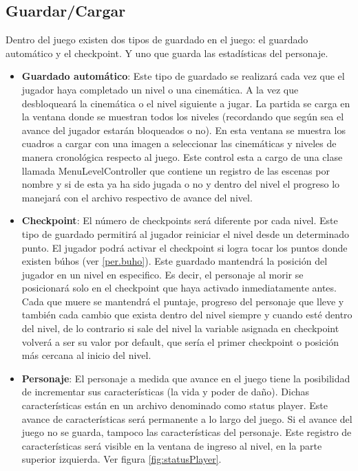 \documentclass[11pt,letterpaper]{article}
\begin{document}
	\subsection{Guardar/Cargar}
Dentro del juego existen dos tipos de guardado en el juego: el guardado automático y el checkpoint. Y uno que guarda las estadísticas del personaje.
\begin{itemize}
\item \textbf{Guardado automático}: 
Este tipo de guardado se realizará cada vez que el jugador haya completado un nivel o una cinemática.
A la vez que desbloqueará la cinemática o el nivel siguiente a jugar.
La partida se carga en la ventana donde se muestran todos los niveles (recordando que según sea el avance del jugador estarán bloqueados o no). En esta ventana se muestra los cuadros a cargar con una imagen a seleccionar las cinemáticas y niveles de manera cronológica respecto al juego.
Este control esta a cargo de una clase llamada MenuLevelController que contiene un registro de las escenas por nombre y si de esta ya ha sido jugada o no y dentro del nivel el progreso lo manejará con el archivo respectivo de avance del nivel.
\item \textbf{Checkpoint}: 
El número de checkpoints será diferente por cada nivel.
Este tipo de guardado permitirá al jugador reiniciar el nivel desde un determinado punto. El jugador podrá activar el checkpoint si logra tocar los puntos donde existen búhos (ver \ref{per.buho}). Este guardado mantendrá la posición del jugador en un nivel en especifico. Es decir, el personaje al morir se posicionará solo en el checkpoint que haya activado inmediatamente antes. 
Cada que muere se mantendrá el puntaje, progreso del personaje que lleve y también cada cambio que exista dentro del nivel siempre y cuando esté dentro del nivel, de lo contrario si sale del nivel la variable asignada en checkpoint volverá a ser su valor por default, que sería el primer checkpoint o posición más cercana al inicio del nivel.
\item \textbf{Personaje}: 
El personaje a medida que avance en el juego tiene la posibilidad de incrementar sus características (la vida y poder de daño). Dichas características están en un archivo denominado como status player.
Este avance de características será permanente a lo largo del juego. Si el avance del juego no se guarda, tampoco las características del personaje. Este registro de características será visible en la ventana de ingreso al nivel, en la parte superior izquierda.
			Ver figura \ref{fig:statusPlayer}.
			\begin{figure}

\end{figure}
\end{itemize}
\end{document}
